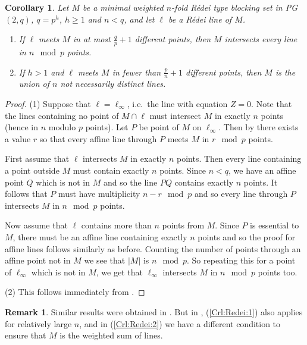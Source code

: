 \documentclass[12pt, a4paper]{article}
\newtheorem{crl}[thm]{Corollary}
\theoremstyle{definition}
\newtheorem{rmk}[thm]{Remark}
\begin{document}
\begin{crl}
 \label{Crl:Redei}
 Let $M$ be a minimal weighted $n$-fold R\'edei type blocking set in PG$(2,q)$, $q=p^h$, $h \geq 1$ and $n<q$, and let $\ell$ be a R\'edei line of $M$. 
\begin{enumerate}
 \item \label{Crl:Redei:1}
 If $\ell$ meets $M$ in at most $\frac{q}{p} + 1$ different points, then $M$ intersects every line in $n \mod p$ points.
 \item \label{Crl:Redei:2} If $h > 1$ and $\ell$ meets $M$ in fewer than $\frac{p}{n} + 1$ different points, then $M$ is the union of $n$ not necessarily distinct lines.
\end{enumerate}
\end{crl}

\begin{proof}
(1)
Suppose that $\ell = \ell_\infty$, i.e.\ the line with equation $Z = 0$.
Note that the lines containing no point of $M \cap \ell$ must intersect $M$ in exactly $n$ points (hence in $n$ modulo $p$ points). 
Let $P$ be point of $M$ on $\ell_\infty$.
Then by  there exists a value $r$ so that every affine line through $P$ meets $M$ in $r \mod p$ points. 

First assume that $\ell$ intersects $M$ in exactly $n$ points. Then every line containing a point outside $M$ must contain exactly $n$ points. Since $n < q$, we have an affine point $Q$ which is not in $M$ and so the line $PQ$ contains exactly $n$ points. It follows that $P$ must have multiplicity $n-r \mod p$ and so every line through $P$ intersects $M$ in $n \mod p$ points.

Now assume that $\ell$ contains more than $n$ points from $M$. Since $P$ is essential to $M$, there must be an affine line containing exactly $n$ points and so the proof for affine lines follows similarly as before. Counting the number of points through an affine point not in $M$ we see that $|M|$ is $n \mod p$. 
So repeating this for a point of $\ell_\infty$ which is not in $M$, we get that $\ell_\infty$ intersects $M$ in $n \mod p$ points too.

\bigskip

(2) This follows immediately from .
 \end{proof}

\begin{rmk}
Similar results were obtained in \cite[Theorem 2.13, Proposition 2.15]{FSSzW}.
But in , (\ref{Crl:Redei:1}) also applies for relatively large $n$, and in (\ref{Crl:Redei:2}) we have a different condition to ensure that $M$ is the weighted sum of lines.     
\end{rmk}
\end{document}
